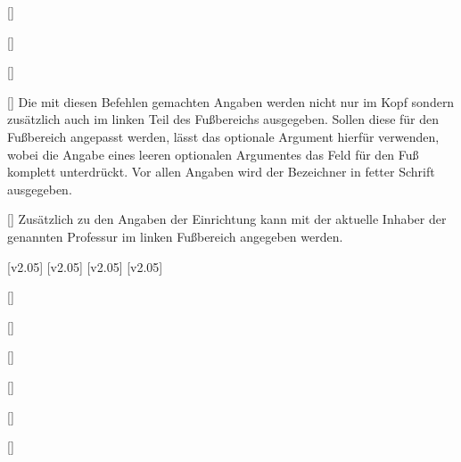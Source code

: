 \begin{Bundle*}[v2.05]{}
\begin{Declaration}{%
  []%
}
\begin{Declaration}{%
  []%
}
\begin{Declaration}{%
  []%
}
\begin{Declaration}{%
  []%
}
\printdeclarationlist%
%
Die mit diesen Befehlen gemachten Angaben werden nicht nur im Kopf sondern 
zusätzlich auch im linken Teil des Fußbereichs ausgegeben. Sollen diese für den 
Fußbereich angepasst werden, lässt das optionale Argument hierfür verwenden, 
wobei die Angabe eines leeren optionalen Argumentes das Feld für den Fuß 
komplett unterdrückt. Vor allen Angaben wird der Bezeichner  
in fetter Schrift ausgegeben.
\end{Declaration}
\end{Declaration}
\end{Declaration}
\end{Declaration}


\begin{Declaration}{[]}
\printdeclarationlist%
%
Zusätzlich zu den Angaben der Einrichtung kann mit  der 
aktuelle Inhaber der genannten Professur im linken Fußbereich angegeben werden.
\end{Declaration}

[v2.05]
[v2.05]
[v2.05]
[v2.05]
\begin{Declaration}{[]}
\begin{Declaration}{[]}
\begin{Declaration}{[]}
\begin{Declaration}{[]}
\begin{Declaration}{[]}
\begin{Declaration}{[]}


\end{Declaration}
\end{Declaration}
\end{Declaration}
\end{Declaration}
\end{Declaration}
\end{Declaration}
\end{Bundle*}
